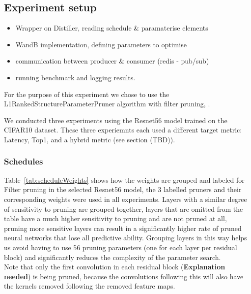 \documentclass[../Dissertation.tex]{subfiles}
\begin{document}
\subsection{Experiment setup}
\begin{itemize}
    \item Wrapper on Distiller, reading schedule \& paramaterise elements
    \item WandB implementation, defining parameters to optimise
    \item communication between producer \& consumer (redis - pub/sub)
    \item running benchmark and logging results.
\end{itemize}

For the purpose of this experiment we chose to use the L1RankedStructureParameterPruner algorithm with filter pruning, .

We conducted three experiments using the Resnet56 model trained on the CIFAR10 dataset. 
These three experiemnts each used a different target metric: Latency, Top1, and a hybrid metric (see section (TBD)).

\newpage
\subsubsection{Schedules}
Table~\ref{tab:scheduleWeights} shows how the weights are grouped and labeled for Filter pruning in the selected Resnet56 model, the 3 labelled pruners and their corresponding weights were used in all experiments.
Layers with a similar degree of sensitivity to pruning are grouped together, layers that are omitted from the table have a much higher sensitivity to pruning and are not pruned at all, pruning more sensitive layers can result in a significantly higher rate of pruned neural networks that lose all predictive ability.
Grouping layers in this way helps us avoid having to use 56 pruning parameters (one for each layer per residual block) and significantly reduces the complexity of the parameter search.\\

Note that only the first convolution in each residual block (\textbf{Explanation needed}) is being pruned, because the convolutions following this will also have the kernels removed following the removed feature maps.
\end{document}
